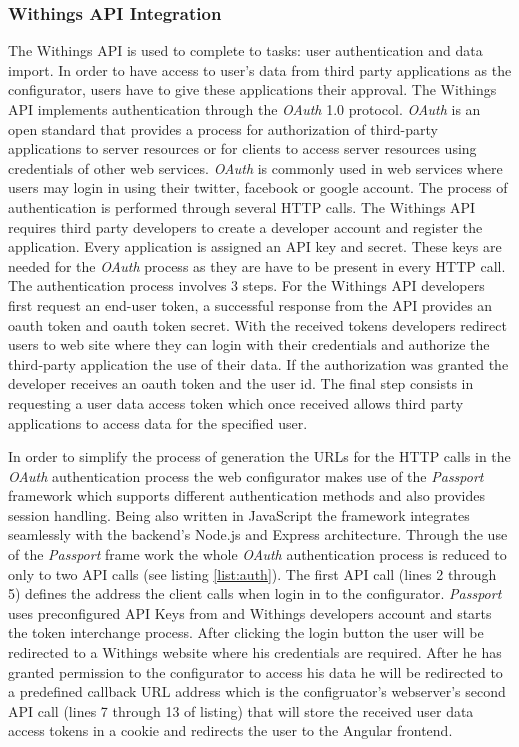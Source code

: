 \documentclass[../medieninformatik-arbeit.tex]{subfiles}
\begin{document}
\subsubsection{Withings API Integration}
\label{sub:ApiIntegration}
The Withings API is used to complete to tasks: user authentication and data import. In order to have access to user's data from third party applications as the configurator, users have to give these applications their approval. The Withings API implements authentication through the \textit{OAuth} 1.0 protocol. \textit{OAuth} is an open standard that provides a process for authorization of third-party applications to server resources or for clients to access server resources using credentials of other web services\cite{hammer2010oauth}. \textit{OAuth} is commonly used in web services where users may login in using their twitter, facebook or google account. The process of authentication is performed through several HTTP calls. The Withings API requires third party developers to create a developer account and register the application. Every application is assigned an API key and secret. These keys are needed for the \textit{OAuth} process as they are have to be present in every HTTP call. The authentication process involves 3 steps. For the Withings API developers first request an end-user token, a successful response from the API provides an oauth token and oauth token secret. With the received tokens developers redirect users to web site where they can login with their credentials and authorize the third-party application the use of their data. If the authorization was granted the developer receives an oauth token and the user id. The final step consists in requesting a user data access token which once received allows third party applications to access data for the specified user. 

In order to simplify the process of generation the URLs for the HTTP calls in the \textit{OAuth} authentication process the web configurator makes use of the \textit{Passport}\cite{passport} framework which supports different authentication methods and also provides session handling. Being also written in JavaScript the framework integrates seamlessly with the backend's Node.js and Express architecture. Through the use of the \textit{Passport} frame work the whole \textit{OAuth} authentication process is reduced to only to two API calls (see listing \ref{list:auth}). The first API call (lines 2 through 5) defines the address the client calls when login in to the configurator. \textit{Passport} uses preconfigured API Keys from and Withings developers account and starts the token interchange process. After clicking the login button the user will be redirected to a Withings website where his credentials are required. After he has granted permission to the configurator to access his data he will be redirected to a predefined callback URL address which is the configruator's webserver's second API call (lines 7 through 13 of listing) that will store the received user data access tokens in a cookie and redirects the user to the Angular frontend. 
\end{document}
